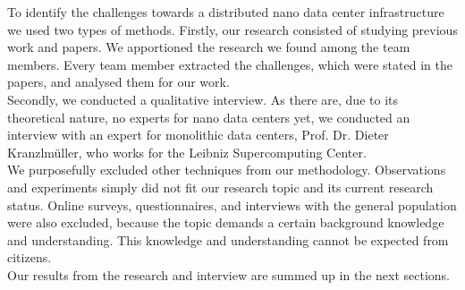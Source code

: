 
To identify the challenges towards a distributed nano data center infrastructure we used two types of methods. Firstly, our research consisted of studying previous work and papers. We apportioned the research we found among the team members. Every team member extracted the challenges, which were stated in the papers, and analysed them for our work. \\
Secondly, we conducted a qualitative interview. As there are, due to its theoretical nature, no experts for nano data centers yet, we conducted an interview \cite{kranzlm} with an expert for monolithic data centers, Prof. Dr. Dieter Kranzlmüller, who works for the Leibniz Supercomputing Center.\\
We purposefully excluded other techniques from our methodology. Observations and experiments simply did not fit our research topic and its current research status. Online surveys, questionnaires, and interviews with the general population were also excluded, because the topic demands a certain background knowledge and understanding. This knowledge and understanding cannot be expected from citizens. \\
Our results from the research and interview are summed up in the next sections. 